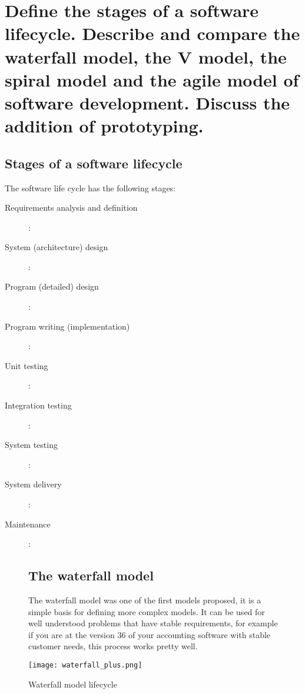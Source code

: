 \clearpage{}
\section{Define the stages of a software lifecycle. Describe and compare the
waterfall model, the V model, the spiral model and the agile model of
software development. Discuss the addition of prototyping.}

\subsection{Stages of a software lifecycle}

The software life cycle has the following stages:

\begin{description}
    \item[Requirements analysis and definition]:
    \item[System (architecture) design]:
    \item[Program (detailed) design]:
    \item[Program writing (implementation)]:
    \item[Unit testing]:
    \item[Integration testing]:
    \item[System testing]:
    \item[System delivery]:
    \item[Maintenance]:
\end{description}

\begin{figure}[!ht]
\begin{minipage}{\linewidth}
\begin{minipage}{0.45\linewidth}
\subsection{The waterfall model} The waterfall model was one of the first
models proposed, it is a simple basis for defining more complex models.
It can be used for well understood problems that have stable requirements,
for example if you are at the version 36 of your accounting software with
stable customer needs, this process works pretty well.

\end{minipage}
\begin{minipage}{0.45\linewidth}
    \centering
    \texttt{[image: waterfall\_plus.png]}
    \caption{Waterfall model lifecycle}
\end{minipage}
\end{minipage}
\end{figure}

